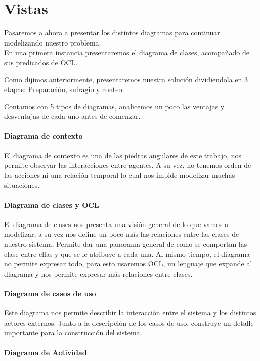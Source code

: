 \section{Vistas}

Pasaremos a ahora a presentar los distintos diagramas para continuar modelizando nuestro problema.\\


En una primera instancia presentaremos el diagrama de clases, acompañado de sus predicados de OCL. 

Como dijimos anteriormente, presentaremos nuestra solución dividiendola en 3 etapas: Preparación, sufragio y conteo. 

Contamos con 5 tipos de diagramas, analicemos un poco las ventajas y desventajas de cada uno antes de comenzar.

\paragraph{Diagrama de contexto} 

El diagrama de contexto es una de las piedras angulares de este trabajo, nos permite observar las interacciones entre agentes. A su vez, no tenemos orden de las acciones ni una relación temporal lo cual nos impide modelizar muchas situaciones.

\paragraph{Diagrama de clases y OCL}

El diagrama de clases nos presenta una visión general de lo que vamos a modelizar, a su vez nos define un poco más las relaciones entre las clases de nuestro sistema. Permite dar una panorama general de como se comportan las clase entre ellas y que se le atribuye a cada una. Al mismo tiempo, el diagrama no permite expresar todo, para esto usaremos OCL, un lenguaje que expande al diagrama y nos permite expresar más relaciones entre clases.

\paragraph{Diagrama de casos de uso}

Este diagrama nos permite describir la interacción entre el sistema y los distintos actores 
externos. Junto a la descripción de los casos de uso, construye un detalle importante para la 
construcción del sistema.

\paragraph{Diagrama de Actividad}

